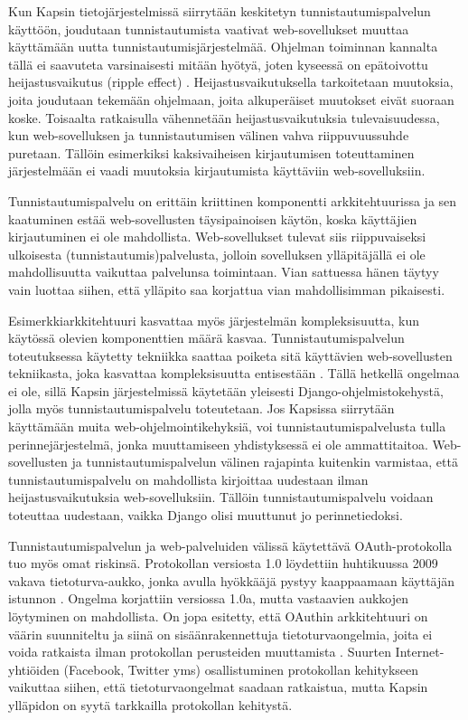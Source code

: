 Kun Kapsin tietojärjestelmissä siirrytään keskitetyn tunnistautumispalvelun käyttöön, joudutaan tunnistautumista vaativat web-sovellukset muuttaa käyttämään uutta tunnistautumisjärjestelmää. Ohjelman toiminnan kannalta tällä ei saavuteta varsinaisesti mitään hyötyä, joten kyseessä on epätoivottu heijastusvaikutus (ripple effect) \cite{arkkitehtuurit}. Heijastusvaikutuksella tarkoitetaan muutoksia, joita joudutaan tekemään ohjelmaan, joita alkuperäiset muutokset eivät suoraan koske. Toisaalta ratkaisulla vähennetään heijastusvaikutuksia tulevaisuudessa, kun web-sovelluksen ja tunnistautumisen välinen vahva riippuvuussuhde puretaan. Tällöin esimerkiksi kaksivaiheisen kirjautumisen toteuttaminen järjestelmään ei vaadi muutoksia kirjautumista käyttäviin web-sovelluksiin.

Tunnistautumispalvelu on erittäin kriittinen komponentti arkkitehtuurissa ja sen kaatuminen estää web-sovellusten täysipainoisen käytön, koska käyttäjien kirjautuminen ei ole mahdollista. Web-sovellukset tulevat siis riippuvaiseksi ulkoisesta (tunnistautumis)palvelusta, jolloin sovelluksen ylläpitäjällä ei ole mahdollisuutta vaikuttaa palvelunsa toimintaan. Vian sattuessa hänen täytyy vain luottaa siihen, että ylläpito saa korjattua vian mahdollisimman pikaisesti.

Esimerkkiarkkitehtuuri kasvattaa myös järjestelmän kompleksisuutta, kun käytössä olevien komponenttien määrä kasvaa. Tunnistautumispalvelun toteutuksessa käytetty tekniikka saattaa poiketa sitä käyttävien web-sovellusten tekniikasta, joka kasvattaa kompleksisuutta entisestään \cite{arkkitehtuurit}. Tällä hetkellä ongelmaa ei ole, sillä Kapsin järjestelmissä käytetään yleisesti Django-ohjelmistokehystä, jolla myös tunnistautumispalvelu toteutetaan. Jos Kapsissa siirrytään käyttämään muita web-oh\-jel\-moin\-ti\-ke\-hyk\-siä, voi tunnistautumispalvelusta tulla perinnejärjestelmä, jonka muuttamiseen yhdistyksessä ei ole ammattitaitoa. Web-sovellusten ja tunnistautumispalvelun välinen rajapinta kuitenkin varmistaa, että tunnistautumispalvelu on mahdollista kirjoittaa uudestaan ilman heijastusvaikutuksia web-sovelluksiin. Tällöin tunnistautumispalvelu voidaan toteuttaa uudestaan, vaikka Django olisi muuttunut jo perinnetiedoksi.

Tunnistautumispalvelun ja web-palveluiden välissä käytettävä OAuth-protokolla tuo myös omat riskinsä. Protokollan versiosta 1.0 löydettiin huhtikuussa 2009 vakava tietoturva-aukko, jonka avulla hyökkääjä pystyy kaappaamaan käyttäjän istunnon \cite{oauth_primer}. Ongelma korjattiin versiossa 1.0a, mutta vastaavien aukkojen löytyminen on mahdollista. On jopa esitetty, että OAuthin arkkitehtuuri on väärin suunniteltu ja siinä on sisäänrakennettuja tietoturvaongelmia, joita ei voida ratkaista ilman protokollan perusteiden muuttamista \cite{oauth_lol}. Suurten Internet-yhtiöiden (Facebook, Twitter yms) osallistuminen protokollan kehitykseen vaikuttaa siihen, että tietoturvaongelmat saadaan ratkaistua, mutta Kapsin ylläpidon on syytä tarkkailla protokollan kehitystä.

